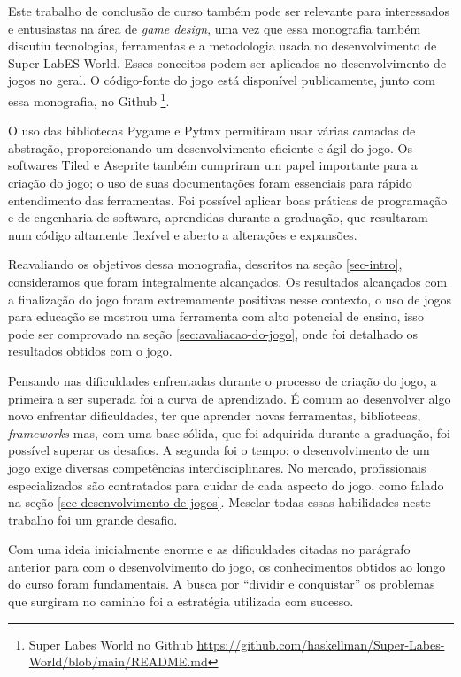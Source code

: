 Este trabalho de conclusão de curso também pode ser relevante para interessados e entusiastas na área de \textit{game design}, uma vez que essa monografia também discutiu tecnologias, ferramentas e a metodologia usada no desenvolvimento de Super LabES World. Esses conceitos podem ser aplicados no desenvolvimento de jogos no geral. O código-fonte do jogo está disponível publicamente, junto com essa monografia, no Github \footnote{Super Labes World no Github \url{https://github.com/haskellman/Super-Labes-World/blob/main/README.md}}.

O uso das bibliotecas Pygame e Pytmx permitiram usar várias camadas de abstração, proporcionando um desenvolvimento eficiente e ágil do jogo. Os softwares Tiled e Aseprite também cumpriram um papel importante para a criação do jogo; o uso de suas documentações foram essenciais para rápido entendimento das ferramentas. Foi possível aplicar boas práticas de programação e de engenharia de software, aprendidas durante a graduação, que resultaram num código altamente flexível e aberto a alterações e expansões.

Reavaliando os objetivos dessa monografia, descritos na seção \ref{sec-intro}, consideramos que foram integralmente alcançados. Os resultados alcançados com a finalização do jogo foram extremamente positivas nesse contexto, o uso de jogos para educação se mostrou uma ferramenta com alto potencial de ensino, isso pode ser comprovado na seção \ref{sec:avaliacao-do-jogo}, onde foi detalhado os resultados obtidos com o jogo. 

Pensando nas dificuldades enfrentadas durante o processo de criação do jogo, a primeira a ser superada foi a curva de aprendizado. É comum ao desenvolver algo novo enfrentar dificuldades, ter que aprender novas ferramentas, bibliotecas, \textit{frameworks} mas, com uma base sólida, que foi adquirida durante a graduação, foi possível superar os desafios. A segunda foi o tempo: o desenvolvimento de um jogo exige diversas competências interdisciplinares. No mercado, profissionais especializados são contratados para cuidar de cada aspecto do jogo, como falado na seção \ref{sec-desenvolvimento-de-jogos}. Mesclar todas essas habilidades neste trabalho foi um grande desafio.

Com uma ideia inicialmente enorme e as dificuldades citadas no parágrafo anterior para com o desenvolvimento do jogo, os conhecimentos obtidos ao longo do curso foram fundamentais. A busca por ``dividir e conquistar'' os problemas que surgiram no caminho foi a estratégia utilizada com sucesso.


